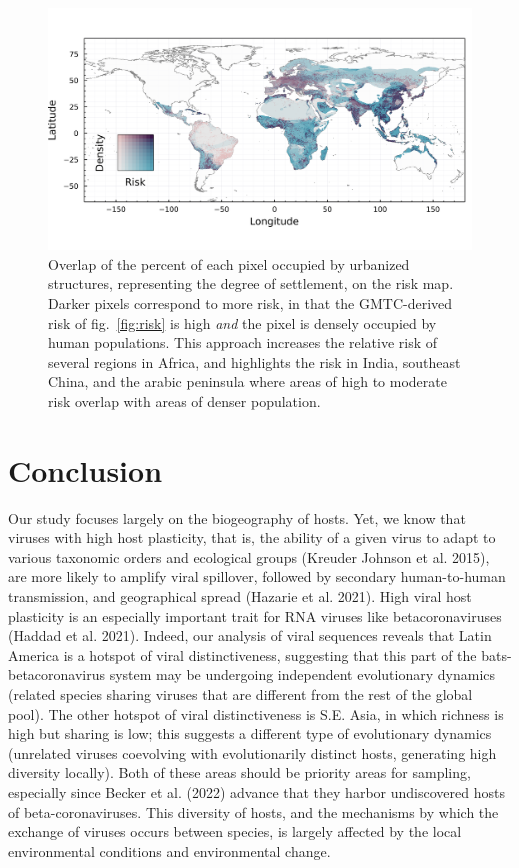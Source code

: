 \documentclass[11pt]{article}
\makeatletter
\def\maxwidth{\ifdim\Gin@nat@width>\linewidth\linewidth
\else\Gin@nat@width\fi}
\let\Oldincludegraphics\includegraphics
\renewcommand{\includegraphics}[1]{\Oldincludegraphics[width=\maxwidth]{#1}}
\makeatother
\begin{document}
\begin{figure}
\hypertarget{fig:compound}{%
\centering
\includegraphics{figures/risk_compounded.png}
\caption{Overlap of the percent of each pixel occupied by urbanized
structures, representing the degree of settlement, on the risk map.
Darker pixels correspond to more risk, in that the GMTC-derived risk of
fig.~\ref{fig:risk} is high \emph{and} the pixel is densely occupied by
human populations. This approach increases the relative risk of several
regions in Africa, and highlights the risk in India, southeast China,
and the arabic peninsula where areas of high to moderate risk overlap
with areas of denser population.}\label{fig:compound}
}
\end{figure}

\hypertarget{conclusion}{%
\section{Conclusion}\label{conclusion}}

Our study focuses largely on the biogeography of hosts. Yet, we know
that viruses with high host plasticity, that is, the ability of a given
virus to adapt to various taxonomic orders and ecological groups
(Kreuder Johnson et al. 2015), are more likely to amplify viral
spillover, followed by secondary human-to-human transmission, and
geographical spread (Hazarie et al. 2021). High viral host plasticity is
an especially important trait for RNA viruses like betacoronaviruses
(Haddad et al. 2021). Indeed, our analysis of viral sequences reveals
that Latin America is a hotspot of viral distinctiveness, suggesting
that this part of the bats-betacoronavirus system may be undergoing
independent evolutionary dynamics (related species sharing viruses that
are different from the rest of the global pool). The other hotspot of
viral distinctiveness is S.E. Asia, in which richness is high but
sharing is low; this suggests a different type of evolutionary dynamics
(unrelated viruses coevolving with evolutionarily distinct hosts,
generating high diversity locally). Both of these areas should be
priority areas for sampling, especially since Becker et al. (2022)
advance that they harbor undiscovered hosts of beta-coronaviruses. This
diversity of hosts, and the mechanisms by which the exchange of viruses
occurs between species, is largely affected by the local environmental
conditions and environmental change.
\end{document}
